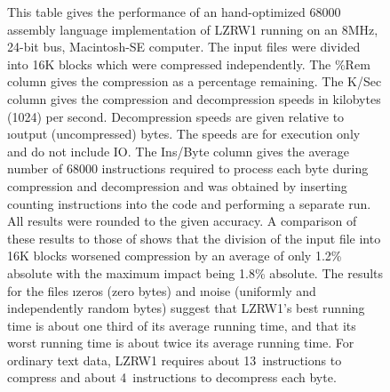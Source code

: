 \begin{figure}
{%
This table gives  the performance of an  hand-optimized 68000 assembly
language  implementation of  LZRW1  running on  an  8MHz, 24-bit  bus,
Macintosh-SE computer.  The input files  were divided into  16K blocks
which  were  compressed  independently.  The \%Rem  column  gives  the
compression  as a  percentage remaining.  The K/Sec  column gives  the
compression and  decompression speeds in kilobytes  (1024) per second.
Decompression speeds  are given relative to  \i{output} (uncompressed)
bytes. The  speeds are for execution  only and do not  include IO. The
Ins/Byte  column  gives  the  average  number  of  68000  instructions
required to process each byte during compression and decompression and
was  obtained by  inserting counting  instructions into  the code  and
performing  a separate  run. All  results  were rounded  to the  given
accuracy. A  comparison of  these results  to those  of 
shows that  the division of  the input  file into 16K  blocks worsened
compression  by an  average of  only 1.2\%  absolute with  the maximum
impact being 1.8\% absolute. The results for the files \i{zeros} (zero
bytes)  and  \i{noise}  (uniformly  and  independently  random  bytes)
suggest  that LZRW1's  best running  time is  about one  third of  its
average running time,  and that its worst running time  is about twice
its average running time. For ordinary text data, LZRW1 requires about
13~instructions  to compress  and about  4~instructions to  decompress
each byte.
%
}
\end{figure}








